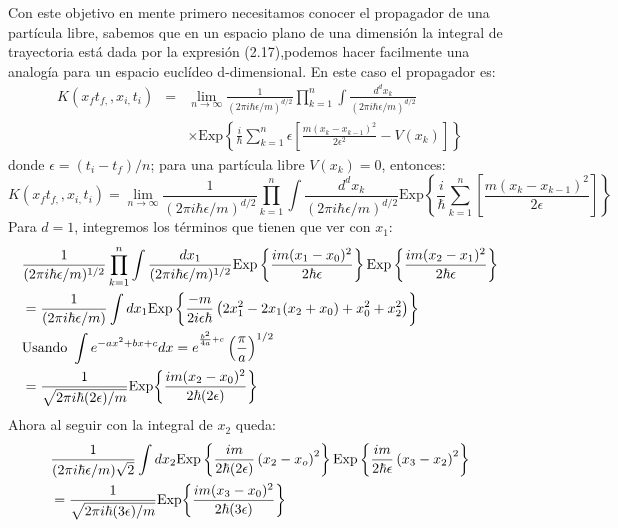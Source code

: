 Con este objetivo en mente primero necesitamos conocer el propagador de una partícula libre, sabemos que en un espacio plano de una dimensión la integral de trayectoria está dada por la expresión (2.17),podemos hacer facilmente una analogía para un espacio euclídeo d-dimensional. En este caso el propagador es:
\begin{eqnarray}
\nonumber K(x_{f}t_{f,},x_{i,}t_{i})&=&\lim_{n\to\infty}\frac{1}{(2\pi i\hbar\epsilon/m)^{d/2}}\prod_{k=1}^{n}\int\frac{d^{d}x_{k}}{(2\pi i\hbar\epsilon/m)^{d/2}}\\
&&\times \text{Exp}\left\{ \frac{i}{\hbar}\sum_{k=1}^{n}\epsilon\left[\frac{m(x_{k}-x_{k-1})^{2}}{2\epsilon^{2}}-V(x_{k})\right]\right\} 
\end{eqnarray}
donde $\epsilon=(t_i-t_f)/n$; para una partícula libre $V(x_k)=0$, entonces:
\begin{equation}
K(x_{f}t_{f,},x_{i,}t_{i})=\lim_{n\to\infty}\frac{1}{(2\pi i\hbar\epsilon/m)^{d/2}}\prod_{k=1}^{n}\int\frac{d^{d}x_{k}}{(2\pi i\hbar\epsilon/m)^{d/2}}\text{Exp}\left\{ \frac{i}{\hbar}\sum_{k=1}^{n}\left[\frac{m(x_{k}-x_{k-1})^{2}}{2\epsilon}\right]\right\}
\end{equation}
Para $d=1$, integremos los términos que tienen que ver con $x_1$:
\begin{eqnarray}
\nonumber &\frac{1}{(2\pi i\hbar\epsilon/m)^{1/2}}\prod_{k=1}^{n}\int\frac{dx_{1}}{(2\pi i\hbar\epsilon/m)^{1/2}}\text{Exp}\left\{ \frac{im(x_{1}-x_{0})^{2}}{2\hbar\epsilon}\right\} \text{Exp}\left\{ \frac{im(x_{2}-x_{1})^{2}}{2\hbar\epsilon}\right\}\\
\nonumber &=\frac{1}{(2\pi i\hbar\epsilon/m)}\int dx_{1}\text{Exp}\left\{ \frac{-m}{2i\epsilon\hbar}\left(2x_{1}^{2}-2x_{1}(x_{2}+x_{0})+x_{0}^{2}+x_{2}^{2}\right)\right\}\\
\nonumber &\text{Usando} \ \int e^{-ax^{2}+bx+c}dx=e^{^{\frac{b^{2}}{4a}+c}}\left(\frac{\pi}{a}\right)^{1/2}\\
\nonumber &=\frac{1}{\sqrt{2\pi i\hbar(2\epsilon)/m}}\text{Exp\ensuremath{\left\{ \frac{im(x_{2}-x_{0})^{2}}{2\hbar(2\epsilon)}\right\} }}
\end{eqnarray}
Ahora al seguir con la integral de $x_2$ queda:
\begin{eqnarray}
\nonumber & \frac{1}{(2\pi i\hbar\epsilon/m)\sqrt{2}}\int dx_{2}\text{Exp}\left\{ \frac{im}{2\hbar(2\epsilon)}\left(x_{2}-x_{o}\right)^{2}\right\} \text{Exp}\left\{ \frac{im}{2\hbar\epsilon}\left(x_{3}-x_{2}\right)^{2}\right\} \\
&=\frac{1}{\sqrt{2\pi i\hbar(3\epsilon)/m}}\text{Exp\ensuremath{\left\{ \frac{im(x_{3}-x_{0})^{2}}{2\hbar(3\epsilon)}\right\} }}
\end{eqnarray}
